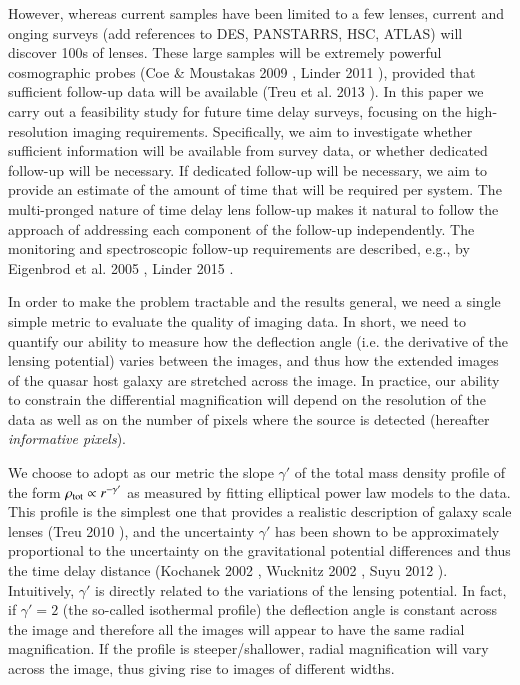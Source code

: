 \documentclass[a4paper,11pt]{article}
\begin{document}
However, whereas current samples have been limited to a few lenses,
current and onging surveys (add references to DES, PANSTARRS, HSC,
ATLAS) will discover 100s of lenses. These large samples will be
extremely powerful cosmographic probes
(Coe \& Moustakas 2009 \citep{2009ApJ...706...45C}, Linder 2011 \citep{2011PhRvD..84l3529L}), provided that sufficient follow-up
data will be available (Treu et al. 2013 \citep{2013arXiv1306.1272T}). In this paper we carry out a
feasibility study for future time delay surveys, focusing on the
high-resolution imaging requirements. Specifically, we aim to
investigate whether sufficient information will be available from
survey data, or whether dedicated follow-up will be necessary. If
dedicated follow-up will be necessary, we aim to provide an estimate
of the amount of time that will be required per system. The
multi-pronged nature of time delay lens follow-up makes it natural to
follow the approach of addressing each component of the follow-up
independently. The monitoring and spectroscopic follow-up requirements
are described, e.g., by Eigenbrod et al. 2005 \cite{2005A&A...436...25E}, Linder 2015 \cite{2015PhRvD..91h3511L}.

In order to make the problem tractable and the results general, we
need a single simple metric to evaluate the quality of imaging
data. In short, we need to quantify our ability to measure how the
deflection angle (i.e. the derivative of the lensing potential) varies
between the images, and thus how the extended images of the quasar
host galaxy are stretched across the image. In practice, our ability
to constrain the differential magnification will depend on the
resolution of the data as well as on the number of pixels where the
source is detected (hereafter {\it informative pixels}).

We choose to adopt as our metric the slope $\gamma'$ of the total mass
density profile of the form $\rho_{\rm tot}\propto r^{-\gamma'}$ as
measured by fitting elliptical power law models to the data. This
profile is the simplest one that provides a realistic description of
galaxy scale lenses (Treu 2010 \citep{2010ARA&A..48...87T}), and the uncertainty $\gamma'$
has been shown to be approximately proportional to the uncertainty on
the gravitational potential differences and thus the time delay
distance
(Kochanek 2002 \citep{2002ApJ...578...25K}, Wucknitz 2002 \citep{2002MNRAS.332..951W}, Suyu 2012 \citep{2012MNRAS.426..868S}). 
Intuitively, $\gamma'$ is directly related to the variations of the
lensing potential. In fact, if $\gamma'=2$ (the so-called isothermal
profile) the deflection angle is constant across the image and
therefore all the images will appear to have the same radial
magnification. If the profile is steeper/shallower, radial
magnification will vary across the image, thus giving rise to images
of different widths.
\end{document}

